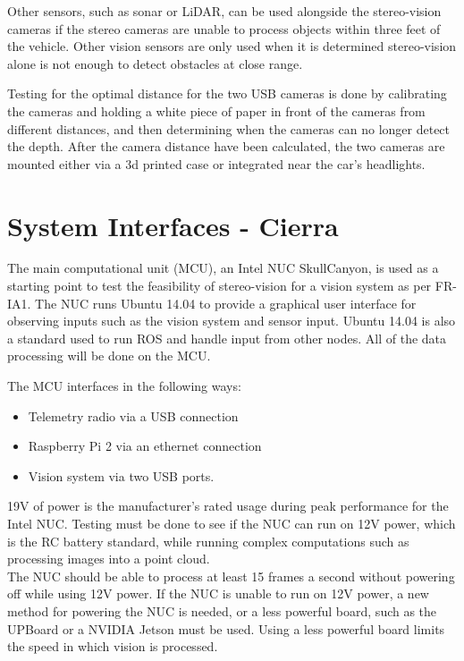 \documentclass[compsoc,draftclsnofoot,onecolumn,10pt]{IEEEtran}
\begin{document}
Other sensors, such as sonar or LiDAR, can be used alongside the stereo-vision cameras if the stereo cameras are unable to process objects within three feet of the vehicle. Other vision sensors are only used when it is determined stereo-vision alone is not enough to detect obstacles at close range. \par
Testing for the optimal distance for the two USB cameras is done by calibrating the cameras and holding a white piece of paper in front of the cameras from different distances, and then determining when the cameras can no longer detect the depth. 
After the camera distance have been calculated, the two cameras are mounted either via a 3d printed case or integrated near the car's headlights. 


\section{System Interfaces - Cierra}
The main computational unit (MCU), an Intel NUC SkullCanyon, is used as a starting point to test the feasibility of stereo-vision for a vision system as per FR-IA1. The NUC runs Ubuntu 14.04 to provide a graphical user interface for observing inputs such as the vision system and sensor input. Ubuntu 14.04 is also a standard used to run ROS and handle input from other nodes. 
All of the data processing will be done on the MCU. \par
The MCU interfaces in the following ways:
\begin{itemize}
\item Telemetry radio via a USB connection
\item Raspberry Pi 2 via an ethernet connection
\item Vision system via two USB ports. 
\end{itemize}
19V of power is the manufacturer's rated usage during peak performance for the Intel NUC. Testing must be done to see if the NUC can run on 12V power, which is the RC battery standard, while running complex computations such as processing images into a point cloud. \\
The NUC should be able to process at least 15 frames a second without powering off while using 12V power. 
If the NUC is unable to run on 12V power, a new method for powering the NUC is needed, or a less powerful board, such as the UPBoard or a NVIDIA Jetson must be used. Using a less powerful board limits the speed in which vision is processed.  \par
\end{document}

